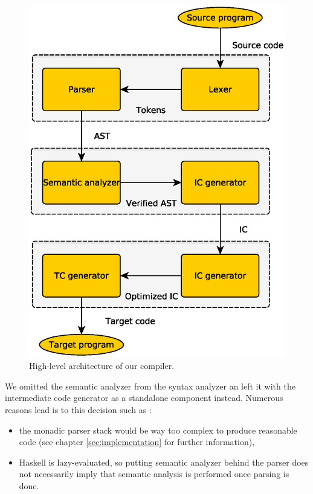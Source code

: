 \documentclass[titlepage]{article}
\begin{document}
\begin{figure}[h!]
	\centering
	\includegraphics[scale=0.5]{figures/compilerArchitecture}
	\caption{High-level architecture of our compiler.}
	\label{fig:architecture}
\end{figure}

We omitted the semantic analyzer from the syntax analyzer an left it with the intermediate
code generator as a standalone component instead. Numerous reasons lead is to this decision 
such as :

\begin{itemize}
	\item the monadic parser stack would be way too complex to produce reasonable code
		(see chapter \ref{sec:implementation} for further information),
	\item Haskell is lazy-evaluated, so putting semantic analyzer behind the parser does
		not necessarily imply that semantic analysis is performed once parsing is done.
\end{itemize}
\end{document}
